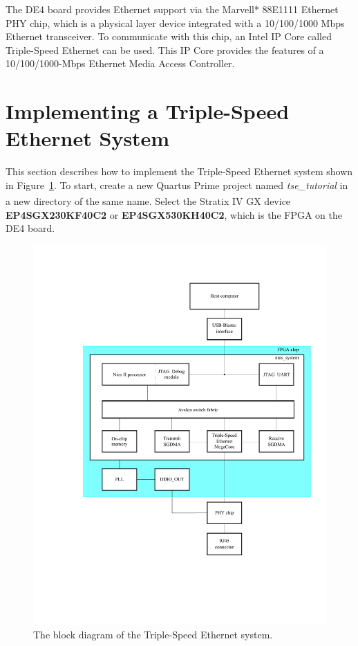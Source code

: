 \documentclass[11pt, twoside, pdftex]{article}
\begin{document}
The DE4 board provides Ethernet support via the Marvell* 88E1111 Ethernet PHY chip, which is a physical layer device integrated with a 10/100/1000 Mbps Ethernet transceiver. To communicate with this chip, an Intel IP Core called Triple-Speed Ethernet can be used. This IP Core provides the features of a 10/100/1000-Mbps Ethernet Media Access Controller.

\section{Implementing a Triple-Speed Ethernet System}
This section describes how to implement the Triple-Speed Ethernet system shown in Figure~\ref{fig:bigsystem_block_diagram}. To start, create a new Quartus Prime project named {\it tse\_tutorial} in a new directory of the same name. Select the Stratix\textsuperscript{\textregistered} IV GX device {\bf EP4SGX230KF40C2} or {\bf EP4SGX530KH40C2}, which is the FPGA on the DE4 board.

\begin{figure}[H]
	\centering
	  \includegraphics[scale=0.85]{figures/bigsystem_block_diagram.pdf}
	\caption{The block diagram of the Triple-Speed Ethernet system.} 
	\label{fig:bigsystem_block_diagram}
\end{figure}
\end{document}
